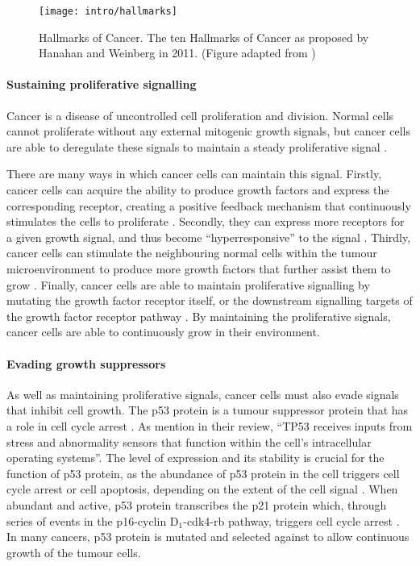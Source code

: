 \begin{figure}[h!]
	\centering
	\texttt{[image: intro/hallmarks]}
	\caption[Hallmarks of Cancer]{Hallmarks of Cancer. The ten Hallmarks of Cancer as proposed by Hanahan and Weinberg in 2011. (Figure adapted from \citet{Hanahan2011})}
	\label{fig:hallmarks}
\end{figure}

\paragraph{Sustaining proliferative signalling}

\noindent
Cancer is a disease of uncontrolled cell proliferation and division.
Normal cells cannot proliferate without any external mitogenic growth signals, but cancer cells are able to deregulate these signals to maintain a steady proliferative signal \citep{Hanahan2011}.

There are many ways in which cancer cells can maintain this signal.
Firstly, cancer cells can acquire the ability to produce growth factors and express the corresponding receptor, creating a positive feedback mechanism that continuously stimulates the cells to proliferate \citep{Hanahan2000}.
Secondly, they can express more receptors for a given growth signal, and thus become ``hyperresponsive'' to the signal \citep{Hanahan2000,Hanahan2011}.
Thirdly, cancer cells can stimulate the neighbouring normal cells within the tumour microenvironment to produce more growth factors that further assist them to grow \citep{Bhowmick2004, Liotta2001, Wiseman2002}.
Finally, cancer cells are able to maintain proliferative signalling by mutating the growth factor receptor itself, or the downstream signalling targets of the growth factor receptor pathway \citep{Fuqua1991,SuHuang1997,Satyamoorthy2003}.
By maintaining the proliferative signals, cancer cells are able to continuously grow in their environment.

\paragraph{Evading growth suppressors}

\noindent
As well as maintaining proliferative signals, cancer cells must also evade signals that inhibit cell growth.
The p53 protein is a tumour suppressor protein that has a  role in cell cycle arrest \citep{Hanahan2011,Levine1997}.
As \citet{Hanahan2011} mention in their review, ``TP53 receives inputs from stress and abnormality sensors that function within the cell's intracellular operating systems''.
The level of expression and its stability is crucial for the function of p53 protein, as the abundance of p53 protein in the cell triggers cell cycle arrest or cell \gls{apoptosis}, depending on the extent of the cell signal \citep{Fridman2003,Hanahan2011,Levine1997}.
When abundant and active, p53 protein transcribes the p21 protein which, through series of events in the p16-cyclin D$_1$-cdk4-\gls{rb} pathway, triggers cell cycle arrest \citep{Levine1997}.
In many cancers, p53 protein is mutated and selected against to allow continuous growth of the tumour cells.

